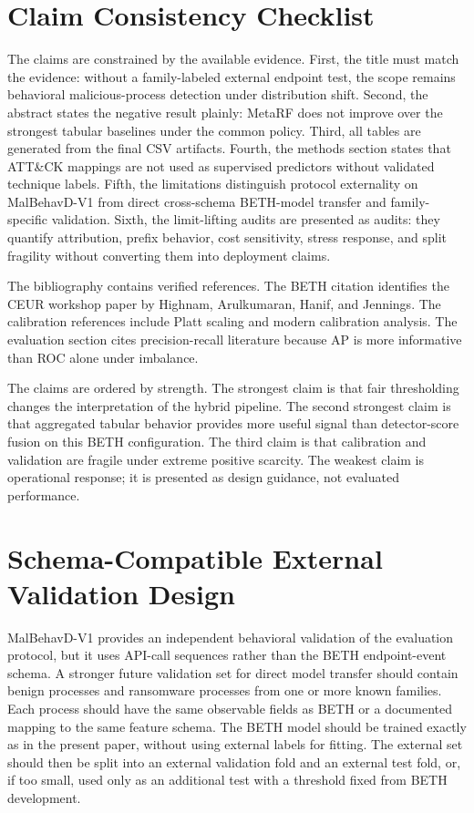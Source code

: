 \documentclass[journal]{IEEEtran}
\begin{document}
\section{Claim Consistency Checklist}
\label{app:claim_consistency}

The claims are constrained by the available evidence. First, the title must match the evidence: without a family-labeled external endpoint test, the scope remains behavioral malicious-process detection under distribution shift. Second, the abstract states the negative result plainly: MetaRF does not improve over the strongest tabular baselines under the common policy. Third, all tables are generated from the final CSV artifacts. Fourth, the methods section states that ATT\&CK mappings are not used as supervised predictors without validated technique labels. Fifth, the limitations distinguish protocol externality on MalBehavD-V1 from direct cross-schema BETH-model transfer and family-specific validation. Sixth, the limit-lifting audits are presented as audits: they quantify attribution, prefix behavior, cost sensitivity, stress response, and split fragility without converting them into deployment claims.

The bibliography contains verified references. The BETH citation identifies the CEUR workshop paper by Highnam, Arulkumaran, Hanif, and Jennings. The calibration references include Platt scaling and modern calibration analysis. The evaluation section cites precision-recall literature because AP is more informative than ROC alone under imbalance.

The claims are ordered by strength. The strongest claim is that fair thresholding changes the interpretation of the hybrid pipeline. The second strongest claim is that aggregated tabular behavior provides more useful signal than detector-score fusion on this BETH configuration. The third claim is that calibration and validation are fragile under extreme positive scarcity. The weakest claim is operational response; it is presented as design guidance, not evaluated performance.

\section{Schema-Compatible External Validation Design}
\label{app:external}

MalBehavD-V1 provides an independent behavioral validation of the evaluation protocol, but it uses API-call sequences rather than the BETH endpoint-event schema. A stronger future validation set for direct model transfer should contain benign processes and ransomware processes from one or more known families. Each process should have the same observable fields as BETH or a documented mapping to the same feature schema. The BETH model should be trained exactly as in the present paper, without using external labels for fitting. The external set should then be split into an external validation fold and an external test fold, or, if too small, used only as an additional test with a threshold fixed from BETH development.
\end{document}
